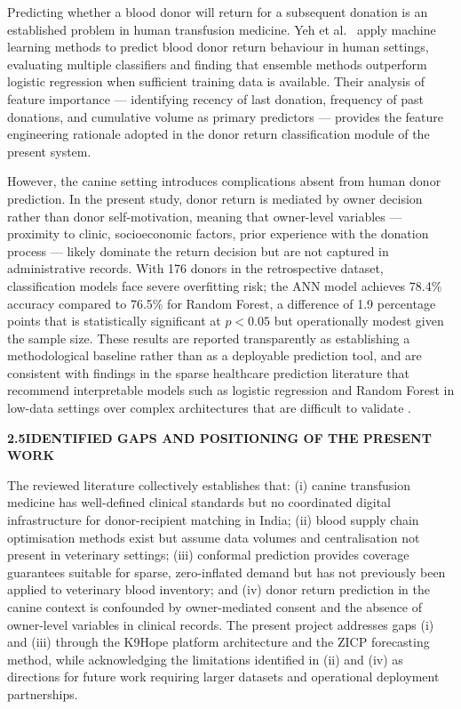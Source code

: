 \documentclass[12pt,a4paper]{article}
\begin{document}
\noindent Predicting whether a blood donor will return for a subsequent donation is an established problem in human transfusion medicine. Yeh et al.\ \cite{yeh2025} apply machine learning methods to predict blood donor return behaviour in human settings, evaluating multiple classifiers and finding that ensemble methods outperform logistic regression when sufficient training data is available. Their analysis of feature importance — identifying recency of last donation, frequency of past donations, and cumulative volume as primary predictors — provides the feature engineering rationale adopted in the donor return classification module of the present system.

\noindent However, the canine setting introduces complications absent from human donor prediction. In the present study, donor return is mediated by owner decision rather than donor self-motivation, meaning that owner-level variables — proximity to clinic, socioeconomic factors, prior experience with the donation process — likely dominate the return decision but are not captured in administrative records. With 176 donors in the retrospective dataset, classification models face severe overfitting risk; the ANN model achieves 78.4\% accuracy compared to 76.5\% for Random Forest, a difference of 1.9 percentage points that is statistically significant at $p < 0.05$ but operationally modest given the sample size. These results are reported transparently as establishing a methodological baseline rather than as a deployable prediction tool, and are consistent with findings in the sparse healthcare prediction literature that recommend interpretable models such as logistic regression and Random Forest in low-data settings over complex architectures that are difficult to validate \cite{chawla2002}.

\vspace{2em}
\noindent\textbf{2.5\quad IDENTIFIED GAPS AND POSITIONING OF THE PRESENT WORK}
\vspace{0.8em}

\noindent The reviewed literature collectively establishes that: (i) canine transfusion medicine has well-defined clinical standards but no coordinated digital infrastructure for donor-recipient matching in India; (ii) blood supply chain optimisation methods exist but assume data volumes and centralisation not present in veterinary settings; (iii) conformal prediction provides coverage guarantees suitable for sparse, zero-inflated demand but has not previously been applied to veterinary blood inventory; and (iv) donor return prediction in the canine context is confounded by owner-mediated consent and the absence of owner-level variables in clinical records. The present project addresses gaps (i) and (iii) through the K9Hope platform architecture and the ZICP forecasting method, while acknowledging the limitations identified in (ii) and (iv) as directions for future work requiring larger datasets and operational deployment partnerships.
\end{document}
